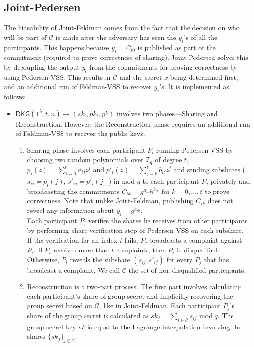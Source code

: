 \documentclass[letterpaper,twocolumn,10pt]{article}
\theoremstyle{definition}
\theoremstyle{remark}
\begin{document}
\subsection{Joint-Pedersen}
\label{appendix:jointPedersen}
The biasability of Joint-Feldman comes from the fact that the decision on who will be part of $\mathcal{C}$ is made after the adversary has seen the $y_i$'s of all the participants. This happens because $y_i = C_{i0}$ is published as part of the commitment (required to prove correctness of sharing). Joint-Pedersen solves this by decoupling the output $y_i$ from the commitments for proving correctness by using Pedersen-VSS. This results in $\mathcal{C}$ and the secret $x$ being determined first, and an additional run of Feldman-VSS to recover $y_i$'s. It is implemented as follows:
\begin{itemize}
    \item $\mathsf{DKG}(1^\lambda, t, n) \rightarrow (sk_i, pk_i, pk)$ involves two phases---Sharing and Reconstruction. However, the Reconstruction phase requires an additional run of Feldman-VSS to recover the public keys. 
    \begin{enumerate}
    \item Sharing phase involves each participant $P_i$ running Pedersen-VSS by choosing two random polynomials over $\mathbb{Z}_q$ of degree $t$, $p_i(z) = \sum_{j = 0}^{t} a_{ij} z^j$ and $p'_i(z) = \sum_{j = 0}^{t} b_{ij} z^j$ and sending subshares ($s_{ij} = p_i(j)$, $s'_{ij} = p'_i(j)$) in mod $q$ to each participant $P_j$ privately and broadcasting the commitments $C_{ik} = g^{a_{ik}} h^{b_{ik}}$ for $k = 0, \ldots, t$ to prove correctness. Note that unlike Joint-Feldman, publishing $C_{ik}$ does not reveal any information about $y_i = g^{a_{i0}}$.\\
    Each participant $P_j$ verifies the shares he receives from other participants by performing share verification step of Pedersen-VSS on each subshare. If the verification for an index $i$ fails, $P_j$ broadcasts a complaint against $P_i$.
    If $P_i$ receives more than $t$ complaints, then $P_i$ is disqualified. Otherwise, $P_i$ reveals the subshare $(s_{ij}, s'_{ij})$ for every $P_j$ that has broadcast a complaint. We call $\mathcal{C}$ the set of non-disqualified participants.
    
    \item Reconstruction is a two-part process. The first part involves calculating each participant's share of group secret and implicitly recovering the group secret based on $\mathcal{C}$, like in Joint-Feldman. Each participant $P_j$'s share of the group secret is calculated as $sk_j = \sum_{i \in \mathcal{C}} s_{ij}$ mod $q$. The group secret key $sk$ is equal to the Lagrange interpolation involving the shares $\{sk_j\}_{j \in \mathcal{C}}$. 
    

\end{enumerate}
\end{itemize}
\end{document}
